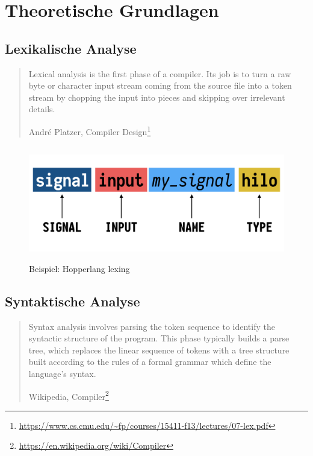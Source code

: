 \documentclass{htw}
\begin{document}
\maketitle


\section{Theoretische Grundlagen}

\subsection{Lexikalische Analyse}

\blockquote[André Platzer, Compiler Design\footnote{\url{https://www.cs.cmu.edu/~fp/courses/15411-f13/lectures/07-lex.pdf}}]{
Lexical analysis is the first phase of a compiler. Its job is to turn a raw byte or character input stream coming from the source file into a token stream by chopping
the input into pieces and skipping over irrelevant details.  
}

\begin{figure}[h]
    \centering
    \includegraphics[height=5cm]{res/lexer.png}
    \caption{Beispiel: Hopperlang lexing}\label{fig:lex}
\end{figure}

\subsection{Syntaktische Analyse}

\blockquote[Wikipedia, Compiler\footnote{\url{https://en.wikipedia.org/wiki/Compiler}}]{
Syntax analysis involves parsing the token sequence to identify the syntactic structure of the program. This phase typically builds a parse tree, which replaces the linear sequence of tokens with a tree structure built according to the rules of a formal grammar which define the language's syntax.
}
\end{document}
